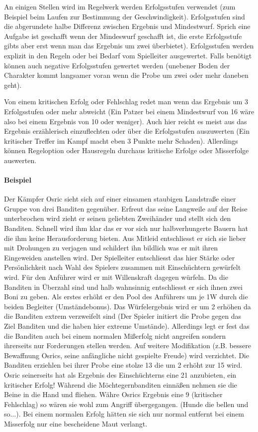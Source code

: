 \documentclass{article}
\begin{document}
An einigen Stellen wird im Regelwerk werden Erfolgsstufen verwendet (zum Beispiel beim Laufen zur Bestimmung der
Geschwindigkeit). Erfolgsstufen sind die abgerundete halbe Differenz zwischen Ergebnis und Mindestwurf. Sprich eine
Aufgabe ist geschafft wenn der Mindeswurf geschafft ist, die erste Erfolgsstufe gibts aber erst wenn man das Ergebnis
um zwei überbietet). Erfolgsstufen werden explizit in den Regeln oder bei Bedarf vom Spielleiter ausgewertet. Falls
benötigt können auch negative Erfolgsstufen gewertet werden (unebener Boden der Charakter kommt langsamer voran wenn
die Probe um zwei oder mehr daneben geht).

Von einem kritischen Erfolg oder Fehlschlag redet man wenn das Ergebnis um 3 Erfolgsstufen oder mehr abweicht (Ein
Patzer bei einem Mindestwurf von 16 wäre also bei einem Ergebnis von 10 oder weniger). Auch hier reicht es meist aus
das Ergebnis erzählerisch einzuflechten oder über die Erfolgsstufen auszuwerten (Ein kritischer Treffer im Kampf
macht eben 3 Punkte mehr Schaden). Allerdings können Regeloption oder Hausregeln durchaus kritische Erfolge oder
Misserfolge auswerten.


\paragraph{Beispiel}

Der Kämpfer Osric sieht sich auf einer einsamen staubigen Landstraße einer Gruppe von drei Banditen gegenüber.
Erfreut das seine Langweile auf der Reise unterbrochen wird zieht er seinen geliebten Zweihänder und stellt sich den
Banditen. Schnell wird ihm klar das er vor sich nur halbverhungerte Bauern hat die ihm keine Herausforderung bieten.
Aus Mitleid entschliesst er sich sie lieber mit Drohungen zu verjagen und schildert ihn bildlich was er mit ihren
Eingeweiden anstellen wird. Der Spielleiter entschliesst das hier Stärke oder Persönlichkeit nach Wahl des Spielers
zusammen mit Einschüchtern gewürfelt wird. Für den Anführer wird er mit Willenskraft dagegen würfeln. Da die Banditen
in Überzahl sind und halb wahnsinnig entschliesst er sich ihnen zwei Boni zu geben. Als erstes erhöht er den Pool des
Anführers um je 1W durch die beiden Begleiter (Umständebonus). Das Würfelergebnis wird er um 2 erhöhen da die
Banditen extrem verzweifelt sind (Der Spieler initiert die Probe gegen das Ziel Banditen und die haben hier extreme
Umstände). Allerdings legt er fest das die Banditen auch bei einem normalen Mißerfolg nicht angreifen sondern
ihrerseits nur Forderungen stellen werden. Auf weitere Modifikation (z.B. bessere Bewaffnung Osrics, seine anfängliche
nicht gespielte Freude) wird verzichtet. Die Banditen erziehlen bei ihrer Probe eine stolze 13 die um 2 erhöht zur 15
wird. Osric seinerseits hat als Ergebnis des Einschüchterns eine 21 anzubieten, ein kritischer Erfolg! Während die
Möchtegernbanditen einnäßen nehmen sie die Beine in die Hand und fliehen. Währe Osrics Ergebnis eine 9 (kritischer
Fehlschlag) so wären sie wohl zum Angriff übergegangen. (Hunde die bellen und so...). Bei einem normalen Erfolg hätten
sie sich nur normal entfernt bei einem Misserfolg nur eine bescheidene Maut verlangt.
\end{document}
